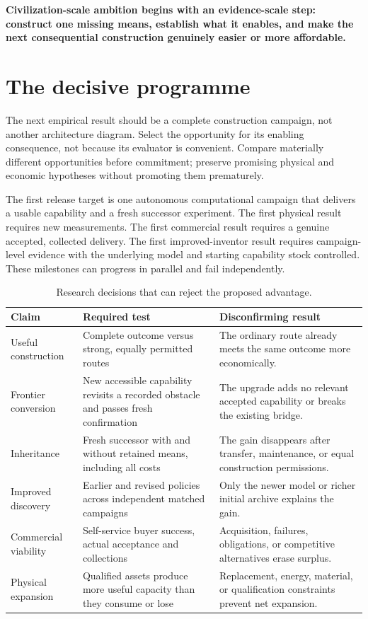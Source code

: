 \documentclass[11pt,letterpaper]{article}
\theoremstyle{remark}\newtheorem{remark}{Remark}[section]
\begin{document}
\begin{thesisbox}
\textbf{Civilization-scale ambition begins with an evidence-scale step: construct one missing means, establish what it enables, and make the next consequential construction genuinely easier or more affordable.}
\end{thesisbox}

\section{The decisive programme}
\label{sec:programme}
The next empirical result should be a complete construction campaign, not another architecture diagram. Select the opportunity for its enabling consequence, not because its evaluator is convenient. Compare materially different opportunities before commitment; preserve promising physical and economic hypotheses without promoting them prematurely.

The first release target is one autonomous computational campaign that delivers a usable capability and a fresh successor experiment. The first physical result requires new measurements. The first commercial result requires a genuine accepted, collected delivery. The first improved-inventor result requires campaign-level evidence with the underlying model and starting capability stock controlled. These milestones can progress in parallel and fail independently.

\begin{table}[htbp]
\caption{Research decisions that can reject the proposed advantage.}
\begin{tabularx}{\linewidth}{P{2.3cm}YY}
\toprule
\textbf{Claim}&\textbf{Required test}&\textbf{Disconfirming result}\\\midrule
Useful construction&Complete outcome versus strong, equally permitted routes&The ordinary route already meets the same outcome more economically.\\
Frontier conversion&New accessible capability revisits a recorded obstacle and passes fresh confirmation&The upgrade adds no relevant accepted capability or breaks the existing bridge.\\
Inheritance&Fresh successor with and without retained means, including all costs&The gain disappears after transfer, maintenance, or equal construction permissions.\\
Improved discovery&Earlier and revised policies across independent matched campaigns&Only the newer model or richer initial archive explains the gain.\\
Commercial viability&Self-service buyer success, actual acceptance and collections&Acquisition, failures, obligations, or competitive alternatives erase surplus.\\
Physical expansion&Qualified assets produce more useful capacity than they consume or lose&Replacement, energy, material, or qualification constraints prevent net expansion.\\\bottomrule
\end{tabularx}
\end{table}
\end{document}
